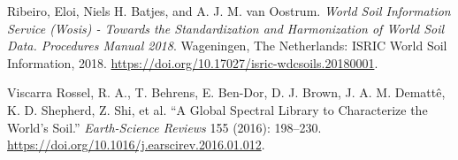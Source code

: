 \documentclass[
  a4paper,
  dvipsnames]{tufte-book}
\begin{document}
\leavevmode\hypertarget{ref-RibeiroEtAl2018}{}%
Ribeiro, Eloi, Niels H. Batjes, and A. J. M. van Oostrum. \emph{World Soil Information Service (Wosis) - Towards the Standardization and Harmonization of World Soil Data. Procedures Manual 2018}. Wageningen, The Netherlands: ISRIC World Soil Information, 2018. \url{https://doi.org/10.17027/isric-wdcsoils.20180001}.

\leavevmode\hypertarget{ref-ViscarraRosselEtAl2016}{}%
Viscarra Rossel, R. A., T. Behrens, E. Ben-Dor, D. J. Brown, J. A. M. Demattê, K. D. Shepherd, Z. Shi, et al. ``A Global Spectral Library to Characterize the World's Soil.'' \emph{Earth-Science Reviews} 155 (2016): 198--230. \url{https://doi.org/10.1016/j.earscirev.2016.01.012}.
\end{document}
